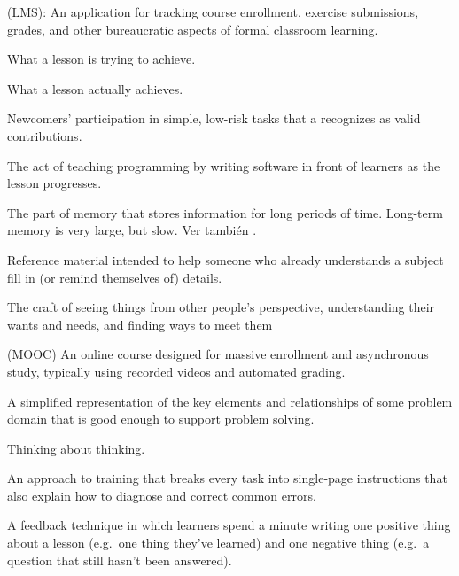 \begin{description}
 (LMS): An application for tracking course
enrollment, exercise submissions, grades, and other bureaucratic aspects of
formal classroom learning.

 What a lesson is trying to
achieve.

 What a lesson actually achieves.

 Newcomers' participation in simple, low-risk tasks that a
 recognizes as valid contributions.

 The act of teaching programming by writing
software in front of learners as the lesson progresses.

 The part of memory that stores
information for long periods of time. Long-term memory is very large, but
slow. Ver también .

 Reference material intended to help someone who
already understands a subject fill in (or remind themselves of) details.

 The craft of seeing things from other people's
perspective, understanding their wants and needs, and finding ways to meet them

 (MOOC) An online course designed
for massive enrollment and asynchronous study, typically using recorded videos
and automated grading.

 A simplified representation of the key
elements and relationships of some problem domain that is good enough to support
problem solving.

 Thinking about thinking.

 An approach to training that breaks
every task into single-page instructions that also explain how to diagnose and
correct common errors.

 A feedback technique in which learners
spend a minute writing one positive thing about a lesson (e.g.\ one thing
they've learned) and one negative thing (e.g.\ a question that still hasn't been
answered).


\end{description}
